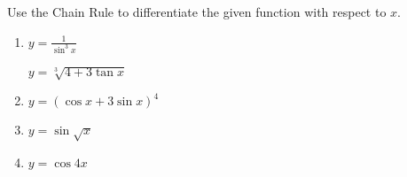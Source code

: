 Use the Chain Rule to differentiate the given function with respect to $x$.   

\begin{enumerate}
\item   $y = \frac{1}{\sin^3x}$

  $y = \sqrt[3]{4+3\tan x}$
%

\item  $y = (\cos x + 3\sin x)^4$

\item  $y = \sin\sqrt{x}$


\item  $y = \cos4x$
\end{enumerate}
